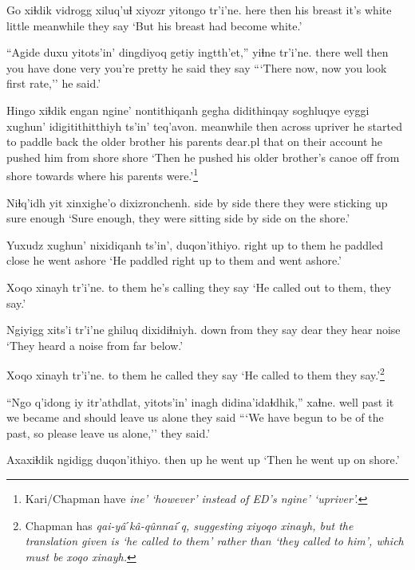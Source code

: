 \documentclass[12pt]{article}
\begin{document}
\gll Go xiɬdik vidrogg xiluq'uɬ  xiyozr yitongo tr'i'ne.
here then {his breast} {it's white} little  meanwhile {they say}
\glt `But his breast had become white.'
\glend

\gll ``Agide duxu yitots'in'  dingdiyoq getiy ingtth'et,'' yiɬne tr'i'ne.
there  well then {you have done} very {you're pretty}  {he said} {they say}
\glt ```There now, now you look first rate,'' he said.'
\glend

\gll Hingo xiɬdik  engan  ngine'  nontithiqanh  gegha  didithinqay  soghluqye eyggi  xughun'   idigitithitthiyh ts'in' teq'avon.
meanwhile  then  across  upriver {he started to paddle back} {the older brother} {his parents} dear.pl  that {on their account } {he pushed him from shore} {} shore
\glt `Then he pushed his older brother's canoe off from shore towards where his parents were.'\footnote{Kari/Chapman have \em ine' \em `however' instead of ED's \em ngine' `upriver'.}
\glend

\gll Niɬq'idh yit xinxighe'o dixizronchenh.
{side by side} there {they were sticking up} {{sure enough}}
\glt `Sure enough, they were sitting side by side on the shore.'
\glend

\gll Yuxudz xughun' nixidiqanh ts'in', duqon'ithiyo.
right {up to them} {he paddled close} {} { he went ashore}
\glt `He paddled right up to them and went ashore.'
\glend

\gll Xoqo xinayh tr'i'ne.
{to them} {he's calling} {they say}
\glt `He called out to them, they say.'
\glend

\gll Ngiyigg xits'i  tr'i'ne ghiluq dixidiɬniyh.
down from  {they say} dear  {they hear noise}
\glt `They heard a noise from far below.'
\glend

\gll Xoqo xinayh tr'i'ne.
{to them} {he called} {they say}
\glt `He called to them they say.'\footnote{Chapman has \em qai-y\^aˊk\^a-q\^unnaiˊq, \em suggesting \em xiyoqo xinayh, \em but the translation given is `he called to them' rather than `they called to him', which must be \em xoqo xinayh.}
\glend

\gll ``Ngo q'idong iy itr'athdlat, yitots'in' inagh didina'idaɬdhik,'' xaɬne.
well past  it {we became} and  should {leave us alone} {they said}
\glt ```We have begun to be of the past, so please leave us alone,'' they said.'
\glend

\gll Axaxiɬdik ngidigg duqon'ithiyo.
then  up  {he went up}
\glt `Then he went up on shore.'
\glend
\end{document}
